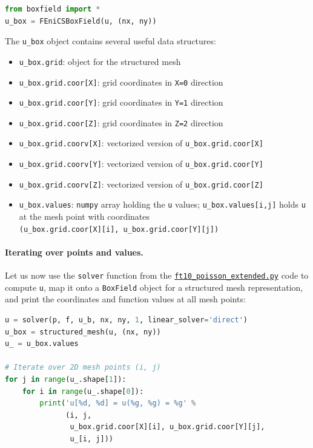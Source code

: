 \documentclass[graybox,envcountchap,sectrefs,final]{svmonodo}
\begin{document}
\begin{lstlisting}[language=Python,style=graycolor]
from boxfield import *
u_box = FEniCSBoxField(u, (nx, ny))
\end{lstlisting}

The \Verb!u_box! object contains several useful data structures:

\begin{itemize}
 \item \Verb!u_box.grid!: object for the structured mesh

 \item \Verb!u_box.grid.coor[X]!: grid coordinates in \texttt{X=0} direction

 \item \Verb!u_box.grid.coor[Y]!: grid coordinates in \texttt{Y=1} direction

 \item \Verb!u_box.grid.coor[Z]!: grid coordinates in \texttt{Z=2} direction

 \item \Verb!u_box.grid.coorv[X]!: vectorized version of \Verb!u_box.grid.coor[X]!

 \item \Verb!u_box.grid.coorv[Y]!: vectorized version of \Verb!u_box.grid.coor[Y]!

 \item \Verb!u_box.grid.coorv[Z]!: vectorized version of \Verb!u_box.grid.coor[Z]!

 \item \Verb!u_box.values!: \texttt{numpy} array holding the \texttt{u} values;
   \Verb!u_box.values[i,j]! holds \texttt{u} at the mesh point with coordinates \\
   \Verb!(u_box.grid.coor[X][i], u_box.grid.coor[Y][j])!
\end{itemize}

\noindent
\paragraph{Iterating over points and values.}
Let us now use the \texttt{solver} function from the
\href{{https://fenicsproject.org/pub/tutorial/python/vol1/ft10_poisson_extended.py}}{\nolinkurl{ft10_poisson_extended.py}}
code to compute \texttt{u}, map it onto a \texttt{BoxField} object for a structured
mesh representation, and print the coordinates and function values
at all mesh points:

\begin{lstlisting}[language=Python,style=graycolor]
u = solver(p, f, u_b, nx, ny, 1, linear_solver='direct')
u_box = structured_mesh(u, (nx, ny))
u_ = u_box.values

# Iterate over 2D mesh points (i, j)
for j in range(u_.shape[1]):
    for i in range(u_.shape[0]):
        print('u[%d, %d] = u(%g, %g) = %g' %
              (i, j,
               u_box.grid.coor[X][i], u_box.grid.coor[Y][j],
               u_[i, j]))
\end{lstlisting}
\end{document}
